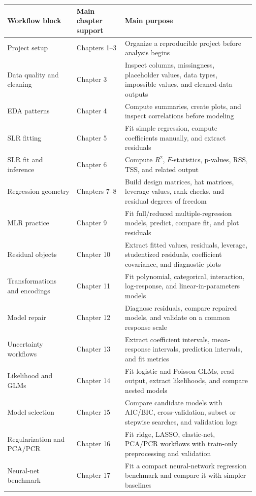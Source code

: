 \begin{center}
\begin{tabular}{>{\raggedright\arraybackslash}p{}>{\raggedright\arraybackslash}p{}>{\raggedright\arraybackslash}p{}}
\hline
Workflow block & Main chapter support & Main purpose \\
\hline
Project setup & Chapters 1--3 & Organize a reproducible project before analysis begins \\
Data quality and cleaning & Chapter 3 & Inspect columns, missingness, placeholder values, data types, impossible values, and cleaned-data outputs \\
EDA patterns & Chapter 4 & Compute summaries, create plots, and inspect correlations before modeling \\
SLR fitting & Chapter 5 & Fit simple regression, compute coefficients manually, and extract residuals \\
SLR fit and inference & Chapter 6 & Compute \(R^2\), \(F\)-statistics, p-values, RSS, TSS, and related output \\
Regression geometry & Chapters 7--8 & Build design matrices, hat matrices, leverage values, rank checks, and residual degrees of freedom \\
MLR practice & Chapter 9 & Fit full/reduced multiple-regression models, predict, compare fit, and plot residuals \\
Residual objects & Chapter 10 & Extract fitted values, residuals, leverage, studentized residuals, coefficient covariance, and diagnostic plots \\
Transformations and encodings & Chapter 11 & Fit polynomial, categorical, interaction, log-response, and linear-in-parameters models \\
Model repair & Chapter 12 & Diagnose residuals, compare repaired models, and validate on a common response scale \\
Uncertainty workflows & Chapter 13 & Extract coefficient intervals, mean-response intervals, prediction intervals, and fit metrics \\
Likelihood and GLMs & Chapter 14 & Fit logistic and Poisson GLMs, read output, extract likelihoods, and compare nested models \\
Model selection & Chapter 15 & Compare candidate models with AIC/BIC, cross-validation, subset or stepwise searches, and validation logs \\
Regularization and PCA/PCR & Chapter 16 & Fit ridge, LASSO, elastic-net, PCA/PCR workflows with train-only preprocessing and validation \\
Neural-net benchmark & Chapter 17 & Fit a compact neural-network regression benchmark and compare it with simpler baselines \\
\hline
\end{tabular}
\end{center}

